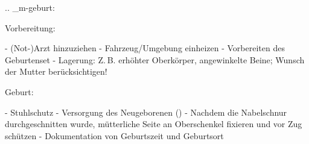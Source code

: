 
.. _m-geburt:


Vorbereitung:
\begin{itemize}
  -   (Not-)Arzt hinzuziehen
  -   Fahrzeug/Umgebung einheizen
  -   Vorbereiten des Geburtenset
  -   Lagerung: Z. B. erhöhter Oberkörper, angewinkelte
  Beine; Wunsch der Mutter berücksichtigen!
\end{itemize}
Geburt:
\begin{itemize}
  -   Stuhlschutz
  -   Versorgung des Neugeborenen
  ()
  -   Nachdem die Nabelschnur durchgeschnitten
  wurde, mütterliche Seite an
  Oberschenkel fixieren und vor Zug schützen
  -   Dokumentation von Geburtszeit und Geburtsort
\end{itemize}